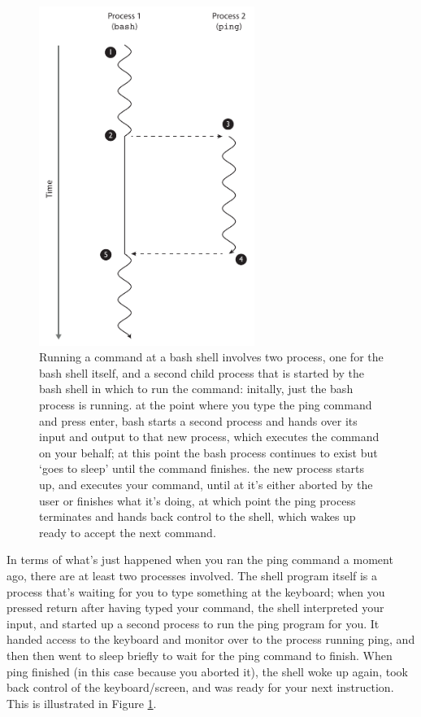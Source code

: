 \begin{figure}
\centerline{\includegraphics[width=7cm]{images/bashandping}}
\caption{Running a command at a bash shell involves two process, one for the bash shell itself, and a second child process that is started by the bash shell in which to run the command: \protect{} initally, just the bash process is running. \protect{} at the point where you type the ping command and press enter, bash starts a second process and hands over its input and output to that new process, which executes the command on your behalf; at this point the bash process continues to exist but `goes to sleep' until the command finishes. \protect{} the new process starts up, and executes your command, until at \protect{} it's either aborted by the user or finishes what it's doing, at which point \protect{} the ping process terminates and hands back control to the shell, which wakes up ready to accept the next command.}\label{figure:bashandping}
\label{fig:bashandping}
\end{figure}

In terms of what's just happened when you ran the ping command a
moment ago, there are at least two processes involved. The shell
program itself is a process that's waiting for you to type something
at the keyboard; when you pressed return after having typed your
command, the shell interpreted your input, and started up a second
process to run the ping program for you. It handed 
access to the keyboard and monitor over to the process running ping,
and then then went to sleep briefly to wait for the ping command to
finish. When ping finished (in this case because you aborted it), the
shell woke up again, took back control of the keyboard/screen, and was
ready for your next instruction. This is illustrated in Figure
\ref{fig:bashandping}.


